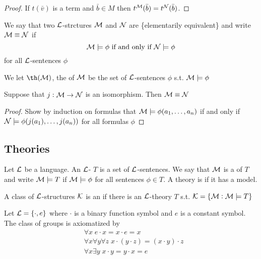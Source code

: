 \documentclass[11pt]{article}
\begin{document}
\begin{proof}
 If \(t(\bar{v})\) is a term and \(\bar{b}\in M\) then
\(t^{\mathcal{M}}(\bar{b})=t^{\mathcal{N}}(\bar{b})\). 
\end{proof}

\begin{definition}[]
We say that two \(\mathcal{L}\)-strctures \(\mathcal{M}\) and \(\mathcal{N}\) are \tf\{elementarily
equivalent\} and write \(\mathcal{M}\equiv\mathcal{N}\) if
\begin{equation*}
 \mathcal{M}\models\phi\text{ if and only if } \mathcal{N}\models\phi
\end{equation*}
for all \(\mathcal{L}\)-sentences \(\phi\)
\end{definition}

We let \(\th(\calm)\), the  of \(\mathcal{M}\) be the set of
\(\mathcal{L}\)-sentences \(\phi\) s.t. \(\mathcal{M}\models\phi\)

\begin{theorem}[]
Suppose that \(j:\mathcal{M}\to\mathcal{N}\) is an isomorphism. Then \(\mathcal{M}\equiv\mathcal{N}\)
\end{theorem}

\begin{proof}
Show by induction on formulas that \(\mathcal{M}\models\phi(a_1,\dots,a_n)\) if and
only if \(\mathcal{N}\models\phi(j(a_1),\dots,j(a_n))\) for all formulas \(\phi\)
\end{proof}
\subsection{Theories}
\label{sec:orgde22d28}
Let \(\mathcal{L}\) be a language. An \(\mathcal{L}\)- \(T\) is a set of
\(\mathcal{L}\)-sentences. We say that \(\mathcal{M}\) is a  of \(T\) and write
\(\mathcal{M}\models T\) if \(\mathcal{M}\models\phi\) for all sentences \(\phi\in T\). A
theory is  if it has a model.

A class of \(\mathcal{L}\)-structures \(\mathcal{K}\) is an  if there
is an \(\mathcal{L}\)-theory \(T\) s.t. \(\mathcal{K}=\{\mathcal{M}:\mathcal{M}\models T\}\)
\begin{examplle}[Groups]
Let \(\mathcal{L}=\{\cdot,e\}\) where \(\cdot\) is a binary function symbol and \(e\) is a 
constant symbol. The class of groups is axiomatized by
\begin{align*}
&\forall x\;e\cdot x=x\cdot e=x\\
&\forall x\forall y\forall z\;x\cdot(y\cdot z)=(x\cdot y)\cdot z\\
&\forall x\exists y\;x\cdot y=y\cdot x= e
\end{align*}
\end{examplle}
\end{document}
